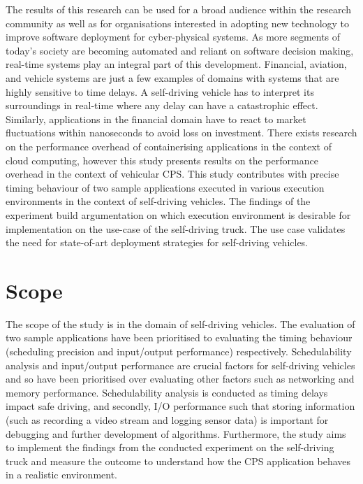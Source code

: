 The results of this research can be used for a broad audience within the research community as well as for organisations interested in adopting new technology to improve software deployment for cyber-physical systems. As more segments of today’s society are becoming automated and reliant on software decision making, real-time systems play an integral part of this development. Financial, aviation, and vehicle systems are just a few examples of domains with systems that are highly sensitive to time delays. A self-driving vehicle has to interpret its surroundings in real-time where any delay can have a catastrophic effect. Similarly, applications in the financial domain have to react to market fluctuations within nanoseconds to avoid loss on investment. There exists research on the performance overhead of containerising applications in the context of cloud computing, however this study presents results on the performance overhead in the context of vehicular CPS. This study contributes with precise timing behaviour of two sample applications executed in various execution environments in the context of self-driving vehicles. The findings of the experiment build argumentation on which execution environment is desirable for implementation on the use-case of the self-driving truck. The use case validates the need for state-of-art deployment strategies for self-driving vehicles. 

\section{Scope}
The scope of the study is in the domain of self-driving vehicles. The evaluation of two sample applications have been prioritised to evaluating the timing behaviour (scheduling precision and input/output performance) respectively. Schedulability analysis and input/output performance are crucial factors for self-driving vehicles and so have been prioritised over evaluating other factors such as networking and memory performance. Schedulability analysis is conducted as timing delays impact safe driving, and secondly, I/O performance such that storing information (such as recording a video stream and logging sensor data) is important for debugging and further development of algorithms. Furthermore, the study aims to implement the findings from the conducted experiment on the self-driving truck and measure the outcome to understand how the CPS application behaves in a realistic environment.


